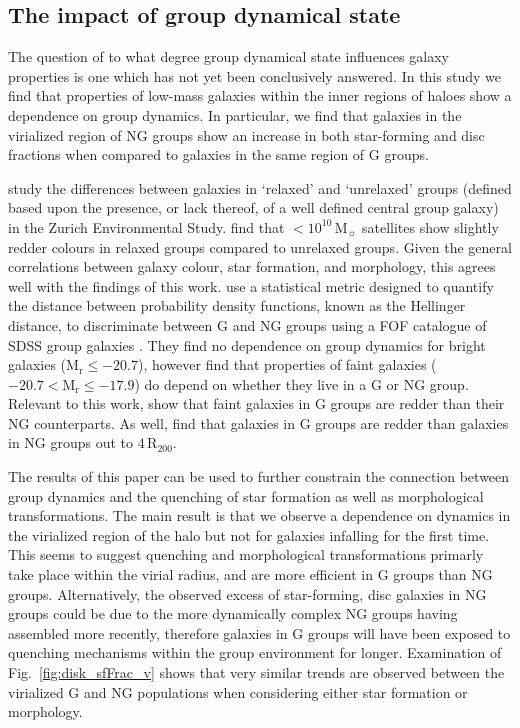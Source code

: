 \documentclass[a4paper,fleqn,usenatbib]{mnras}
\newcommand{\Msun}{\,\mathrm{M_{\sun}}}
\begin{document}
\subsection{The impact of group dynamical state}

The question of to what degree group dynamical state influences galaxy
properties is one which has not yet been conclusively answered.  In
this study we find that properties of low-mass galaxies within the inner
regions of haloes show a dependence on group dynamics.  In
particular, we find that galaxies in the virialized region of NG
groups show an increase in both star-forming and disc fractions
when compared to galaxies in the same region of G groups.
\par
\citet{carollo2013} study the differences between galaxies in
`relaxed' and `unrelaxed' groups (defined based upon the presence, or
lack thereof, of a well defined central group galaxy) in the Zurich
Environmental Study.  \citet{carollo2013} find that $<10^{10}\Msun$
satellites show slightly redder colours in relaxed groups compared to
unrelaxed groups.  Given the general correlations between galaxy colour, star
formation, and morphology, this agrees well with the findings of this
work. \citet{ribeiro2013} use a statistical metric designed to quantify the
distance between probability density functions, known as the Hellinger
distance, to discriminate between G and NG groups using a
FOF catalogue of SDSS group galaxies
\citep{berlind2006}.  They find no dependence on group dynamics for
bright galaxies ($\mathrm{M_r} \le -20.7$), however find that
properties of faint galaxies ($-20.7 < \mathrm{M_r} \le -17.9$) do
depend on whether they live in a G or NG group.  Relevant to this
work, \citet{ribeiro2013} show that faint galaxies in G groups are
redder than their NG counterparts. As well, \citet{ribeiro2010} find
that galaxies in G groups are redder than galaxies in NG groups out to $4\,\mathrm{R_{200}}$.
\par
The results of this paper can be used to further constrain the
connection between group dynamics and the quenching of star formation as well
as morphological transformations.  The main result is that we observe a
dependence on dynamics in the virialized region of the halo but not
for galaxies infalling for the first time.  This seems to suggest
quenching and morphological transformations primarly take
place within the virial radius, and are more efficient in G
groups than NG groups.  Alternatively, the observed excess of
star-forming, disc galaxies in NG groups could be due to the more
dynamically complex NG groups having assembled more recently,
therefore galaxies in G groups will have been exposed to quenching
mechanisms within the group environment for longer.  Examination of
Fig.~\ref{fig:disk_sfFrac_v} shows that very similar trends are observed
between the virialized G and NG populations when considering either
star formation or morphology.
\end{document}
